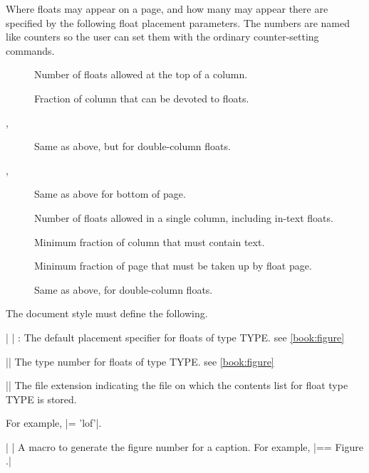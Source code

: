  Where floats may appear on a page, and how many may appear there
 are specified by the following float placement parameters.  The
 numbers are named like counters so the user can set them with
 the ordinary counter-setting commands.
 
 \begin{description}
  \item[\string\c@topnumber] Number of floats allowed at the top of a column.
  
  \item[\string\topfraction] Fraction of column that can be devoted to floats.
  
  \item[\string\c@dbltopnumber, \string\dbltopfraction]  Same as above, but for double-column floats.

  \item[\string\c@bottomnumber, \string\bottomfraction ]
                     Same as above for bottom of page.
 
 \item[\string\c@totalnumber]    Number of floats allowed in a single column,
                          including in-text floats.
 
 \item[\string\textfraction]     Minimum fraction of column that must contain text.

  \item[\string\floatpagefraction] Minimum fraction of page that must be taken
                          up by float page.
                          
\item[\string\dblfloatpagefraction]   Same as above, for double-column floats.
\end{description}

 The document style must define the following.

   | \fps@TYPE|   : The default placement specifier for floats of type
                  TYPE.  see \ref{book:figure}

    |\ftype@TYPE|  The type number for floats of type TYPE. see \ref{book:figure}

    |\ext@TYPE|   The file extension indicating the file on which the
                  contents list for float type TYPE is stored.

  For example,  |\ext@figure = 'lof'|.

   | \fnum@TYPE|  A macro to generate the figure number for a caption.
                  For example, |\fnum@TYPE == Figure \thefigure.|

